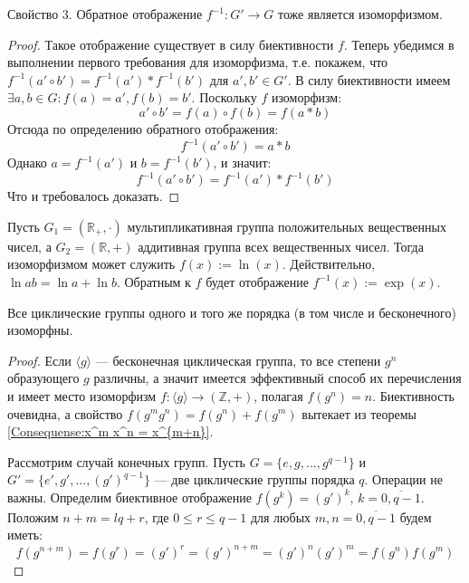 \begin{theorem}
    Свойство 3. Обратное отображение $f^{-1}:G'\to G$ тоже является изоморфизмом.
\end{theorem}
\begin{proof}
    Такое отображение существует в силу биективности $f$. Теперь убедимся в выполнении первого требования для изоморфизма, т.е. покажем, что $f^{-1}(a'\circ b')=f^{-1}(a')*f^{-1}(b')$ для $a',b' \in G'$.
    В силу биективности имеем $\exists a,b \in G : f(a)=a', f(b)=b'$. Поскольку $f$ изоморфизм:
    \begin{equation*}
        a' \circ b' = f(a) \circ f(b) = f(a*b)
    \end{equation*}
    Отсюда по определению обратного отображения:
    \begin{equation*}
        f^{-1}(a'\circ b')=a*b
    \end{equation*}
    Однако $a=f^{-1}(a')$ и $b=f^{-1}(b')$, и значит:
    \begin{equation*}
        f^{-1}(a'\circ b') = f^{-1}(a') * f^{-1}(b') 
    \end{equation*}
    Что и требовалось доказать.
\end{proof}

\begin{example}
    Пусть $G_1=(\mathbb{R}_+ , \cdot)$ мультипликативная группа положительных вещественных чисел, а $G_2=(\mathbb{R}, +)$ аддитивная группа всех вещественных чисел. Тогда изоморфизмом может служить $f(x) := \ln(x)$. Действительно, $\ln ab = \ln a + \ln b$. Обратным к $f$ будет отображение $f^{-1}(x):=\exp(x)$. 
\end{example}

\begin{theorem}
    Все циклические группы одного и того же порядка (в том числе и бесконечного) изоморфны.
\end{theorem}
\begin{proof}
    Если $\langle g \rangle$ --- бесконечная циклическая группа, то все степени $g^n$ образующего $g$ различны, а значит имеется эффективный способ их перечисления и имеет место изоморфизм $f:\langle g \rangle \to (\mathbb{Z},+)$, полагая $f(g^n)=n$. Биективность очевидна, а свойство $f(g^mg^n)=f(g^n)+f(g^m)$ вытекает из теоремы \ref{Consequense:x^m x^n = x^{m+n}}.

    Рассмотрим случай конечных групп. Пусть $G=\{e,g,...,g^{q-1}\}$ и $G'=\{e',g',...,(g')^{q-1}\}$ --- две циклические группы порядка $q$. Операции не важны. Определим биективное отображение $f(g^k)=(g')^k$, $k=\overline{0,q-1}$. Положим $n+m=lq+r$, где $0\le r \le q-1$ для любых $m,n=\overline{0,q-1}$ будем иметь:
    \begin{equation*}
        f(g^{n+m})=f(g^r)=(g')^r=(g')^{n+m}=(g')^n(g')^m=f(g^n)f(g^m)
    \end{equation*}
\end{proof}

